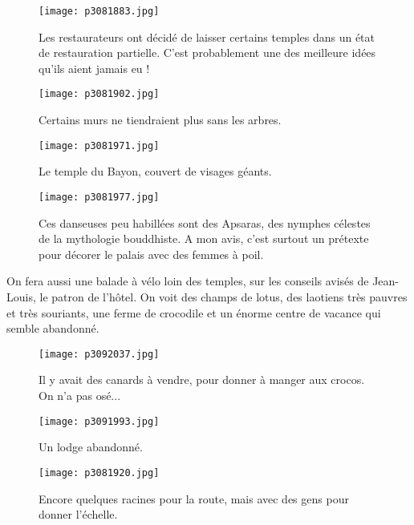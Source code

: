 \documentclass{book}
\begin{document}
\begin{figure}[h]
\centering
\texttt{[image: p3081883.jpg]}
\caption*{Les restaurateurs ont décidé de laisser certains temples dans un état de restauration partielle. C'est probablement une des meilleure idées qu'ils aient jamais eu !}
\end{figure}


\begin{figure}[h]
\centering
\texttt{[image: p3081902.jpg]}
\caption*{Certains murs ne tiendraient plus sans les arbres.}
\end{figure}


\begin{figure}[h]
\centering
\texttt{[image: p3081971.jpg]}
\caption*{Le temple du Bayon, couvert de visages géants.}
\end{figure}


\begin{figure}[h]
\centering
\texttt{[image: p3081977.jpg]}
\caption*{Ces danseuses peu habillées sont des Apsaras, des nymphes célestes de la mythologie bouddhiste. A mon avis, c'est surtout un prétexte pour décorer le palais avec des femmes à poil.}
\end{figure}

On fera aussi une balade à vélo loin des temples, sur les conseils avisés de Jean-Louis, le patron de l'hôtel. On voit des champs de lotus, des laotiens très pauvres et très souriants, une ferme de crocodile et un énorme centre de vacance qui semble abandonné.


\begin{figure}[h]
\centering
\texttt{[image: p3092037.jpg]}
\caption*{Il y avait des canards à vendre, pour donner à manger aux crocos. On n'a pas osé...}
\end{figure}


\begin{figure}[h]
\centering
\texttt{[image: p3091993.jpg]}
\caption*{Un lodge abandonné.}
\end{figure}


\begin{figure}[h]
\centering
\texttt{[image: p3081920.jpg]}
\caption*{Encore quelques racines pour la route, mais avec des gens pour donner l'échelle.}
\end{figure}
\end{document}
